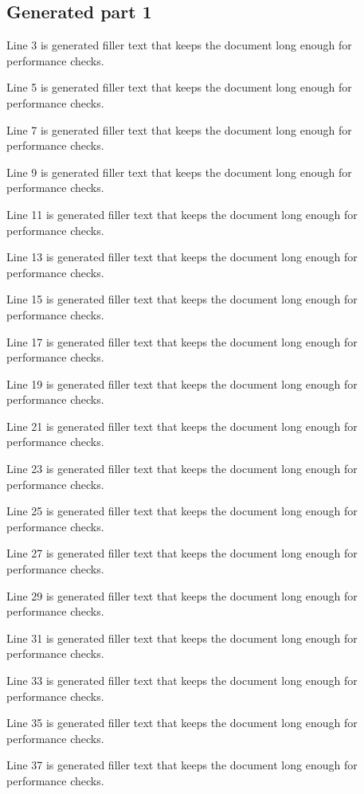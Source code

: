 \subsection{Generated part 1}

Line 3 is generated filler text that keeps the document long enough for performance checks.

Line 5 is generated filler text that keeps the document long enough for performance checks.

Line 7 is generated filler text that keeps the document long enough for performance checks.

Line 9 is generated filler text that keeps the document long enough for performance checks.

Line 11 is generated filler text that keeps the document long enough for performance checks.

Line 13 is generated filler text that keeps the document long enough for performance checks.

Line 15 is generated filler text that keeps the document long enough for performance checks.

Line 17 is generated filler text that keeps the document long enough for performance checks.

Line 19 is generated filler text that keeps the document long enough for performance checks.

Line 21 is generated filler text that keeps the document long enough for performance checks.

Line 23 is generated filler text that keeps the document long enough for performance checks.

Line 25 is generated filler text that keeps the document long enough for performance checks.

Line 27 is generated filler text that keeps the document long enough for performance checks.

Line 29 is generated filler text that keeps the document long enough for performance checks.

Line 31 is generated filler text that keeps the document long enough for performance checks.

Line 33 is generated filler text that keeps the document long enough for performance checks.

Line 35 is generated filler text that keeps the document long enough for performance checks.

Line 37 is generated filler text that keeps the document long enough for performance checks.

